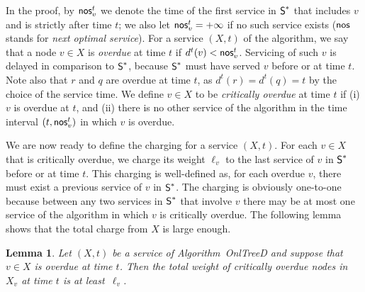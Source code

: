 \documentclass[a4paper]{article}
\newtheorem{lemma}[theorem]{Lemma}
\newcommand{\length}{\ell}
\newcommand{\OnAlgTreesDeadlines}{{\sc OnlTreeD}}
\newcommand{\optschedS}{\mbox{\rm\textsf{S}}^\ast}
\newcommand{\advtrans}{\mbox{\rm\textsf{nos}}}
\begin{document}
In the proof, by $\advtrans^t_v$ we denote the time of the first
service in $\optschedS$
that includes $v$ and is strictly after time $t$; we
also let $\advtrans^t_v=+\infty$ if no such service exists  
($\advtrans$ stands for \emph{next optimal service}).
For a service $(X,t)$ of the algorithm, we say that a node $v\in X$ is
\emph{overdue} at time $t$ if $d^t(v)<\advtrans^t_v$. Servicing of
such $v$ is delayed in comparison to $\optschedS$, because
$\optschedS$ must have served $v$ before or at time $t$.  Note
also that $r$ and $q$ are overdue at time $t$, as $d^t(r)=d^t(q)=t$ by
the choice of the service time.  We define $v\in X$ to be \emph{critically
  overdue} at time $t$ if (i) $v$ is overdue at $t$, and (ii)
there is no other service of the algorithm in the time interval
$(t,\advtrans^t_v)$ in which $v$ is overdue.

We are now ready to define the charging for a service $(X,t)$.  For
each $v\in X$ that is critically overdue, we charge its weight
$\length_v$ to the last service of $v$ in $\optschedS$ before or at
time $t$.  This charging is well-defined as, for each overdue $v$,
there must exist a previous service of $v$ in $\optschedS$. The
charging is obviously one-to-one because between any two services in
$\optschedS$ that involve $v$ there may be at most one service of the
algorithm in which $v$ is critically overdue.  The following lemma
shows that the total charge from $X$ is large enough.


\begin{lemma}\label{l:d:charge}
Let $(X,t)$ be a service of Algorithm~{\OnAlgTreesDeadlines} and
suppose that $v\in X$ is overdue at time $t$. 
Then the total weight of critically overdue nodes in $X_v$ at time $t$
is at least~$\length_v$.
\end{lemma}
\end{document}
